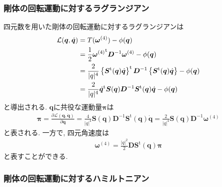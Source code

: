\subsubsection{剛体の回転運動に対するラグランジアン}
四元数を用いた剛体の回転運動に対するラグランジアンは
\begin{align}
 \mathcal{L}(\bm{q},\dot{\bm{q}})
 &=
 T(\bm{\omega}^{(4)}) - \phi(\bm{q})
 \notag
 \\
 &=
 \frac{1}{2} {\bm{\omega}^{(4)}}^{\mathrm{t}} \bm{D}^{-1} \bm{\omega}^{(4)} - \phi(\bm{q})
 \notag
 \\
 &=
 \frac{2}{|q|^{4}}
 \left\{
         \bm{S}^{\mathrm{t}} (\bm{q}) \dot{\bm{q}}
 \right\}^{\mathrm{t}}
 \bm{D}^{-1}
 \left\{
        \bm{S}^{\mathrm{t}}(\bm{q}) \dot{\bm{q}}
 \right\}
 - \phi(\bm{q})
 \notag
 \\
 &=
 \frac{2}{|q|^{4}}
 \dot{\bm{q}}^{\mathrm{t}} \bm{S}(\bm{q})
 \bm{D}^{-1}
 \bm{S}^{\mathrm{t}}(\bm{q}) \dot{\bm{q}}
 - \phi(\bm{q})
\label{eq:RigidBodyMD22}
\end{align}
と導出される. 
$\bm{q}$に共役な運動量$\bm{\pi}$は
\begin{align}
 \bm{\pi}
 =
 \frac{\partial \mathcal{L}(\bm{q},\dot{\bm{q}})}{\partial \dot{\bm{q}}}
 =
 \frac{4}{|q|^4}\bm{S}(\bm{q}) \bm{D}^{-1}
 \bm{S}^{\mathrm{t}}(\bm{q})
 \dot{\bm{q}}
 =
 \frac{2}{|q|^{4}} \bm{S}(\bm{q}) \bm{D}^{-1} \bm{\omega}^{(4)}
\label{eq:RigidBodyMD23}
\end{align}
と表される. 一方で, 四元角速度は
\begin{align}
  \bm{\omega}^{(4)}
  =
  \frac{|q|^{2}}{2}
  \bm{D}\bm{S}^{\mathrm{t}}(\bm{q})\bm{\pi}
\end{align}
と表すことができる.


\subsubsection{剛体の回転運動に対するハミルトニアン}

